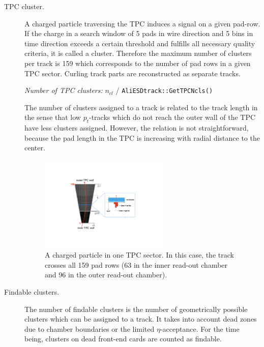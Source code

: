 \documentclass[12pt]{article}
\begin{document}
	\begin{description}
	
	\item[TPC cluster.] A charged particle traversing the TPC induces a signal on a given pad-row. If the charge in a search window of 5 pads in wire direction and 5 bins in time direction exceeds a certain threshold and fulfills all necessary quality criteria, it is called a cluster. Therefore the maximum number of clusters per track is 159 which corresponds to the number of pad rows in a given TPC sector. Curling track parts are reconstructed as separate tracks.
	
\medskip
	{\it Number of TPC clusters:} $n_{cl}$ / {\tt AliESDtrack::GetTPCNcls() } 
\medskip
	
	The number of clusters assigned to a track is related to the track length in the sense that low $p_{t}$-tracks which do not reach the outer wall of the TPC have less clusters assigned. However, the relation is not straightforward, because the pad length in the TPC is increasing with radial distance to the center.
	
	
\begin{figure}[htbp]
\begin{center}
\includegraphics[width=0.6\textwidth]{figures/TPCpadRows}
\caption{A charged particle in one TPC sector. In this case, the track crosses all 159 pad rows (63 in the inner read-out chamber and 96 in the outer read-out chamber).}
\label{figTPCpadRows}
\end{center}
\end{figure}

	
	\item[Findable clusters.] The number of findable clusters is the number of geometrically possible clusters which can be assigned to a track. It takes into account dead zones due to chamber boundaries or the limited $\eta$-acceptance. For the time being, clusters on dead front-end cards are counted as findable.


\end{description}
\end{document}
